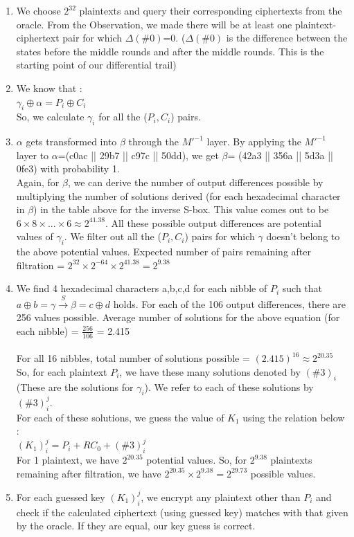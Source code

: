 \documentclass{transcrypto}
\begin{document}
\begin{enumerate}
    \item We choose $2^{32}$ plaintexts and query their corresponding ciphertexts from the oracle. From the Observation, we made there will be at least one plaintext-ciphertext pair for which $\Delta(\#0)$=0. ($\Delta(\#0)$ is the difference between the states before the middle rounds and after the middle rounds. This is the starting point of our differential trail) 
    \item We know that : \\
    $\gamma_i \oplus \alpha =  P_i \oplus C_i$  \\
    So, we calculate $\gamma_i$ for all the ($P_i,C_i$) pairs. \\
    \item $\alpha$ gets transformed into $\beta$ through the $M'^{-1}$ layer. By applying the $M'^{-1}$ layer to $\alpha$=(c0ac || 29b7 || c97c || 50dd), we get $\beta$= (42a3 || 356a || 5d3a || 0fe3) with probability 1. \\
    Again, for $\beta$, we can derive the number of output differences possible by multiplying the number of solutions derived (for each hexadecimal character in $\beta$) in the table above for the inverse S-box. This value comes out to be $6 \times 8 \times ... \times 6 \approx 2^{41.38}$.
    All these  possible output differences are potential values of $\gamma_i$. We filter out all the ($P_i,C_i$) pairs for which $\gamma$ doesn't belong to the above potential values.
    Expected number of pairs remaining after filtration = $2^{32} \times 2^{-64} \times 2^{41.38} = 2^{9.38}$  
    \item We find 4 hexadecimal characters a,b,c,d for each nibble of $P_i$ such that $a \oplus b = \gamma \xrightarrow{S} \beta= c \oplus d$  holds. For each of the 106 output differences, there are 256 values possible. Average number of solutions for the above equation (for each nibble) = $\frac{256}{106}$ = 2.415 \\ \\
    For all 16 nibbles, total number of solutions possible = $(2.415)^{16} \approx 2^{20.35}$ \\ 
    So, for each plaintext $P_i$, we have these many solutions denoted by $(\#3)_i$ (These are the solutions for $\gamma_i$). We refer to each of these solutions by  $(\#3)^j_i$. \\
    For each of these solutions, we guess the value of $K_1$ using the relation below : \\
    $(K_1)^j_i = P_i + RC_0 + (\#3)^j_i $ \\
    For 1 plaintext, we have $2^{20.35}$ potential values. So, for $2^{9.38}$ plaintexts remaining after filtration, we have $2^{20.35} \times 2^{9.38} = 2^{29.73}$ possible values.  
    \item For each guessed key $(K_1)^j_i$, we encrypt any plaintext other than $P_i$ and check if the calculated ciphertext (using guessed key) matches with that given by the oracle. If they are equal, our key guess is correct.
\end{enumerate}
\end{document}
